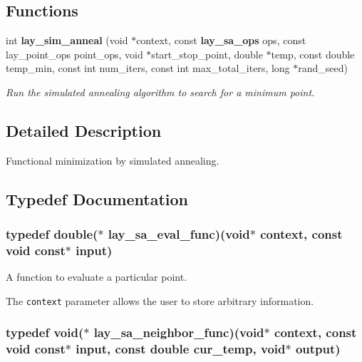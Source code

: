 \subsection*{Functions}
\begin{CompactItemize}
\item 
int {\bf lay\_\-sim\_\-anneal} (void $\ast$context, const  {\bf lay\_\-sa\_\-ops} ops, const  lay\_\-point\_\-ops point\_\-ops, void $\ast$start\_\-stop\_\-point, double $\ast$temp, const  double temp\_\-min, const  int num\_\-iters, const  int max\_\-total\_\-iters, long $\ast$rand\_\-seed)\label{sim__anneal_8h_a3}

\begin{CompactList}\small\item\em Run the simulated annealing algorithm to search for a minimum point. \item\end{CompactList}\end{CompactItemize}


\subsection{Detailed Description}
Functional minimization by simulated annealing. 



\subsection{Typedef Documentation}
\subsubsection{\setlength{\rightskip}{0pt plus 5cm}typedef double($\ast$ {\bf lay\_\-sa\_\-eval\_\-func})(void$\ast$ context, const void const$\ast$ input)}\label{sim__anneal_8h_a1}


A function to evaluate a particular point. 

The {\tt context} parameter allows the user to store arbitrary information. 
\subsubsection{\setlength{\rightskip}{0pt plus 5cm}typedef void($\ast$ {\bf lay\_\-sa\_\-neighbor\_\-func})(void$\ast$ context, const void const$\ast$ input, const double cur\_\-temp, void$\ast$ output)}\label{sim__anneal_8h_a0}


